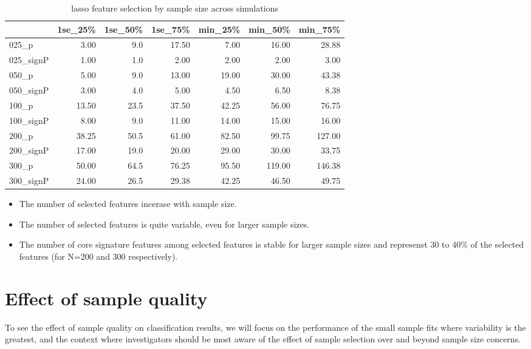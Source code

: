 \documentclass[
]{book}
\begin{document}
\begin{table}

\caption{\label{tab:print-lasso-simRes-features-OverSim}lasso feature selection by sample size across simulations}
\centering
\begin{tabular}[t]{l|r|r|r|r|r|r}
\hline
  & 1se\_25\% & 1se\_50\% & 1se\_75\% & min\_25\% & min\_50\% & min\_75\%\\
\hline
025\_p & 3.00 & 9.0 & 17.50 & 7.00 & 16.00 & 28.88\\
\hline
025\_signP & 1.00 & 1.0 & 2.00 & 2.00 & 2.00 & 3.00\\
\hline
050\_p & 5.00 & 9.0 & 13.00 & 19.00 & 30.00 & 43.38\\
\hline
050\_signP & 3.00 & 4.0 & 5.00 & 4.50 & 6.50 & 8.38\\
\hline
100\_p & 13.50 & 23.5 & 37.50 & 42.25 & 56.00 & 76.75\\
\hline
100\_signP & 8.00 & 9.0 & 11.00 & 14.00 & 15.00 & 16.00\\
\hline
200\_p & 38.25 & 50.5 & 61.00 & 82.50 & 99.75 & 127.00\\
\hline
200\_signP & 17.00 & 19.0 & 20.00 & 29.00 & 30.00 & 33.75\\
\hline
300\_p & 50.00 & 64.5 & 76.25 & 95.50 & 119.00 & 146.38\\
\hline
300\_signP & 24.00 & 26.5 & 29.38 & 42.25 & 46.50 & 49.75\\
\hline
\end{tabular}
\end{table}

\begin{itemize}
\item
  The number of selected features incerase with sample size.
\item
  The number of selected features is quite variable, even for larger sample sizes.
\item
  The number of core signature features among selected features is stable for larger sample
  sizes and represenst 30 to 40\% of the selected features (for N=200 and 300 respectively).
\end{itemize}

\hypertarget{effect-of-sample-quality}{%
\section{Effect of sample quality}\label{effect-of-sample-quality}}

To see the effect of sample quality on classification results, we will
focus on the performance of the small sample fits where variability is the
greatest, and the context where investigators should be most aware of the
effect of sample selection over and beyond sample size concerns.
\end{document}
